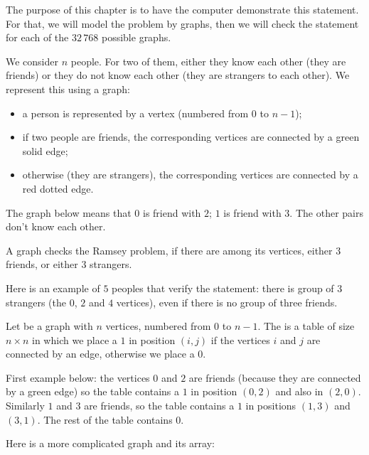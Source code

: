 \documentclass[11pt,class=report,crop=false]{standalone}
\begin{document}
\begin{cours}


The purpose of this chapter is to have the computer demonstrate this statement. For that, we will model the problem by graphs, then we will check the statement for each of the $32\,768$ possible graphs.

\bigskip 

We consider $n$ people. For two of them, either they know each other (they are friends) or they do not know each other (they are strangers to each other). We represent this using a graph:
\begin{itemize}
  \item a person is represented by a vertex (numbered from $0$ to $n-1$);
  \item if two people are friends, the corresponding vertices are connected by a green solid edge;
  \item otherwise (they are strangers), the corresponding vertices are connected by a red dotted edge. 
\end{itemize}

The graph below means that $0$ is friend with $2$; $1$ is friend with $3$. The other pairs don't know each other.

A graph checks the Ramsey problem, if there are among its vertices, either $3$ friends, or either $3$ strangers.

Here is an example of $5$ peoples that verify the statement: there is group of $3$ strangers (the $0$, $2$ and $4$ vertices), even if there is no group of three friends.

\end{cours}


\begin{cours}[Model]



Let be a graph with $n$ vertices, numbered from $0$ to $n-1$.
The  is a table of size $n \times n$ in which we place a $1$ in position $(i,j)$ if the vertices $i$ and $j$ are connected by an edge, otherwise we place a $0$.

\bigskip
First example below: the vertices $0$ and $2$ are friends (because they are connected by a green edge) so the table contains a $1$ in position $(0,2)$ and also in $(2,0)$. Similarly $1$ and $3$ are friends, so the table contains a $1$ in positions $(1,3)$ and $(3,1)$. The rest of the table contains $0$.


Here is a more complicated graph and its array:

\end{cours}
\end{document}
